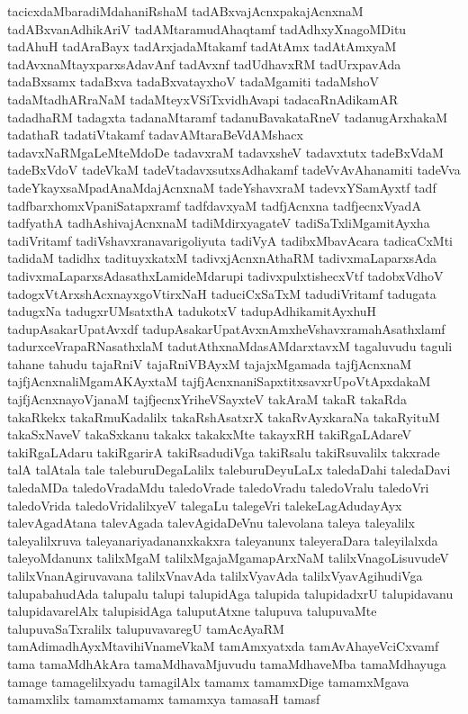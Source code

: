 {tacicxdaMbaradiMdahaniRshaM
tadABxvajAcnxpakajAcnxnaM
tadABxvanAdhikAriV
tadAMtaramudAhaqtamf
tadAdhxyXnagoMDitu
tadAhuH
tadAraBayx
tadArxjadaMtakamf
tadAtAmx
tadAtAmxyaM
tadAvxnaMtayxparxsAdavAnf
tadAvxnf
tadUdhavxRM
tadUrxpavAda
tadaBxsamx
tadaBxva
tadaBxvatayxhoV
tadaMgamiti
tadaMshoV
tadaMtadhARraNaM
tadaMteyxVSiTxvidhAvapi
tadacaRnAdikamAR
tadadhaRM
tadagxta
tadanaMtaramf
tadanuBavakataRneV
tadanugArxhakaM
tadathaR
tadatiVtakamf
tadavAMtaraBeVdAMshacx
tadavxNaRMgaLeMteMdoDe
tadavxraM
tadavxsheV
tadavxtutx
tadeBxVdaM
tadeBxVdoV
tadeVkaM
tadeVtadavxsutxsAdhakamf
tadeVvAvAhanamiti
tadeVva
tadeYkayxsaMpadAnaMdajAcnxnaM
tadeYshavxraM
tadevxYSamAyxtf
tadf
tadfbarxhomxVpaniSatapxramf
tadfdavxyaM
tadfjAcnxna
tadfjecnxVyadA
tadfyathA
tadhAshivajAcnxnaM
tadiMdirxyagateV
tadiSaTxliMgamitAyxha
tadiVritamf
tadiVshavxranavarigoliyuta
tadiVyA
tadibxMbavAcara
tadicaCxMti
tadidaM
tadidhx
tadituyxkatxM
tadivxjAcnxnAthaRM
tadivxmaLaparxsAda
tadivxmaLaparxsAdasathxLamideMdarupi
tadivxpulxtishecxVtf
tadobxVdhoV
tadogxVtArxshAcxnayxgoVtirxNaH
taduciCxSaTxM
tadudiVritamf
tadugata
tadugxNa
tadugxrUMsatxthA
tadukotxV
tadupAdhikamitAyxhuH
tadupAsakarUpatAvxdf
tadupAsakarUpatAvxnAmxheVshavxramahAsathxlamf
tadurxceVrapaRNasathxlaM
tadutAthxnaMdasAMdarxtavxM
tagaluvudu
taguli
tahane
tahudu
tajaRniV
tajaRniVBAyxM
tajajxMgamada
tajfjAcnxnaM
tajfjAcnxnaliMgamAKAyxtaM
tajfjAcnxnaniSapxtitxsavxrUpoVtApxdakaM
tajfjAcnxnayoVjanaM
tajfjecnxYriheVSayxteV
takAraM
takaR
takaRda
takaRkekx
takaRmuKadalilx
takaRshAsatxrX
takaRvAyxkaraNa
takaRyituM
takaSxNaveV
takaSxkanu
takakx
takakxMte
takayxRH
takiRgaLAdareV
takiRgaLAdaru
takiRgarirA
takiRsadudiVga
takiRsalu
takiRsuvalilx
takxrade
talA
talAtala
tale
taleburuDegaLalilx
taleburuDeyuLaLx
taledaDahi
taledaDavi
taledaMDa
taledoVradaMdu
taledoVrade
taledoVradu
taledoVralu
taledoVri
taledoVrida
taledoVridalilxyeV
talegaLu
talegeVri
talekeLagAdudayAyx
talevAgadAtana
talevAgada
talevAgidaDeVnu
talevolana
taleya
taleyalilx
taleyalilxruva
taleyanariyadananxkakxra
taleyanunx
taleyeraDara
taleyilalxda
taleyoMdanunx
talilxMgaM
talilxMgajaMgamapArxNaM
talilxVnagoLisuvudeV
talilxVnanAgiruvavana
talilxVnavAda
talilxVyavAda
talilxVyavAgihudiVga
talupabahudAda
talupalu
talupi
talupidAga
talupida
talupidadxrU
talupidavanu
talupidavarelAlx
talupisidAga
taluputAtxne
talupuva
talupuvaMte
talupuvaSaTxralilx
talupuvavaregU
tamAcAyaRM
tamAdimadhAyxMtavihiVnameVkaM
tamAmxyatxda
tamAvAhayeVciCxvamf
tama
tamaMdhAkAra
tamaMdhavaMjuvudu
tamaMdhaveMba
tamaMdhayuga
tamage
tamagelilxyadu
tamagilAlx
tamamx
tamamxDige
tamamxMgava
tamamxlilx
tamamxtamamx
tamamxya
tamasaH
tamasf
}
